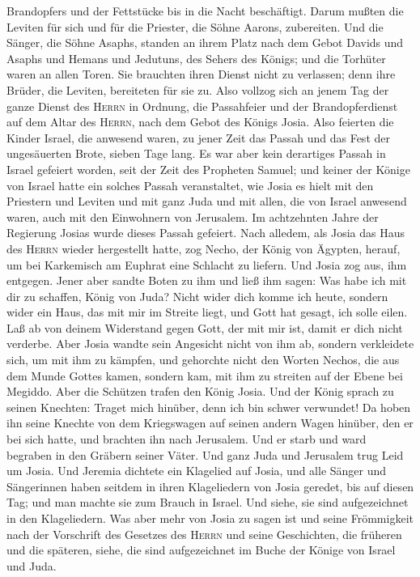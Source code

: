 Brandopfers und der Fettstücke bis in die Nacht beschäftigt. Darum
mußten die Leviten für sich und für die Priester, die Söhne Aarons,
zubereiten.  Und die Sänger, die Söhne Asaphs, standen an
ihrem Platz nach dem Gebot Davids und Asaphs und Hemans und Jedutuns,
des Sehers des Königs; und die Torhüter waren an allen Toren. Sie
brauchten ihren Dienst nicht zu verlassen; denn ihre Brüder, die
Leviten, bereiteten für sie zu.  Also vollzog sich an
jenem Tag der ganze Dienst des \textsc{Herrn} in Ordnung, die
Passahfeier und der Brandopferdienst auf dem Altar des \textsc{Herrn},
nach dem Gebot des Königs Josia.  Also feierten die
Kinder Israel, die anwesend waren, zu jener Zeit das Passah und das Fest
der ungesäuerten Brote, sieben Tage lang.  Es war aber
kein derartiges Passah in Israel gefeiert worden, seit der Zeit des
Propheten Samuel; und keiner der Könige von Israel hatte ein solches
Passah veranstaltet, wie Josia es hielt mit den Priestern und Leviten
und mit ganz Juda und mit allen, die von Israel anwesend waren, auch mit
den Einwohnern von Jerusalem.  Im achtzehnten Jahre der
Regierung Josias wurde dieses Passah gefeiert.  Nach
alledem, als Josia das Haus des \textsc{Herrn} wieder hergestellt hatte,
zog Necho, der König von Ägypten, herauf, um bei Karkemisch am Euphrat
eine Schlacht zu liefern. Und Josia zog aus, ihm entgegen.
 Jener aber sandte Boten zu ihm und ließ ihm sagen: Was
habe ich mit dir zu schaffen, König von Juda? Nicht wider dich komme ich
heute, sondern wider ein Haus, das mit mir im Streite liegt, und Gott
hat gesagt, ich solle eilen. Laß ab von deinem Widerstand gegen Gott,
der mit mir ist, damit er dich nicht verderbe.  Aber
Josia wandte sein Angesicht nicht von ihm ab, sondern verkleidete sich,
um mit ihm zu kämpfen, und gehorchte nicht den Worten Nechos, die aus
dem Munde Gottes kamen, sondern kam, mit ihm zu streiten auf der Ebene
bei Megiddo.  Aber die Schützen trafen den König Josia.
Und der König sprach zu seinen Knechten: Traget mich hinüber, denn ich
bin schwer verwundet!  Da hoben ihn seine Knechte von dem
Kriegswagen auf seinen andern Wagen hinüber, den er bei sich hatte, und
brachten ihn nach Jerusalem. Und er starb und ward begraben in den
Gräbern seiner Väter. Und ganz Juda und Jerusalem trug Leid um Josia.
 Und Jeremia dichtete ein Klagelied auf Josia, und alle
Sänger und Sängerinnen haben seitdem in ihren Klageliedern von Josia
geredet, bis auf diesen Tag; und man machte sie zum Brauch in Israel.
Und siehe, sie sind aufgezeichnet in den Klageliedern. 
Was aber mehr von Josia zu sagen ist und seine Frömmigkeit nach der
Vorschrift des Gesetzes des \textsc{Herrn}  und seine
Geschichten, die früheren und die späteren, siehe, die sind
aufgezeichnet im Buche der Könige von Israel und Juda.

